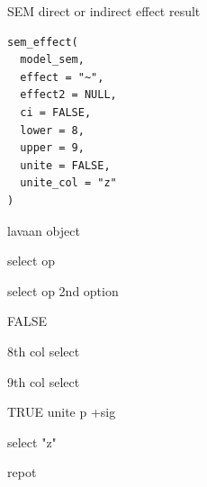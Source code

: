 \documentclass[a4paper]{book}
\begin{document}
%
\begin{Description}
SEM direct or indirect  effect result
\end{Description}
%
\begin{Usage}
\begin{verbatim}
sem_effect(
  model_sem,
  effect = "~",
  effect2 = NULL,
  ci = FALSE,
  lower = 8,
  upper = 9,
  unite = FALSE,
  unite_col = "z"
)
\end{verbatim}
\end{Usage}
%
\begin{Arguments}
\begin{ldescription}
\item[\code{model\_sem}] lavaan object

\item[\code{effect}] select op

\item[\code{effect2}] select op 2nd option

\item[\code{ci}] FALSE

\item[\code{lower}] 8th col select

\item[\code{upper}] 9th col select

\item[\code{unite}] TRUE unite p +sig

\item[\code{unite\_col}] select "z"
\end{ldescription}
\end{Arguments}
%
\begin{Value}
repot
\end{Value}
%
\end{document}
